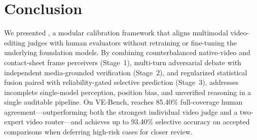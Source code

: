 \section{Conclusion}
\label{sec:conclusion}

We presented \critical, a modular calibration framework that aligns multimodal video-editing judges with human evaluators without retraining or fine-tuning the underlying foundation models. By combining counterbalanced native-video and contact-sheet frame perceivers (Stage~1), multi-turn adversarial debate with independent media-grounded verification (Stage~2), and regularized statistical fusion paired with reliability-gated selective prediction (Stage~3), \critical addresses incomplete single-model perception, position bias, and unverified reasoning in a single auditable pipeline. On VE-Bench, \critical reaches 85.40\% full-coverage human agreement---outperforming both the strongest individual video judge and a two-expert video router---and achieves up to 93.40\% selective accuracy on accepted comparisons when deferring high-risk cases for closer review.
